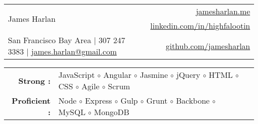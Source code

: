 \documentclass[11pt]{article}
\begin{document}
\setlength{\tabcolsep}{0in}

\begin{center}
\begin{tabularx}{1.0\textwidth}{l X r}
  \multirow{2}{*}{\Huge{James Harlan}}& & \href{http://www.jamesharlan.me}{\color{blue}jamesharlan.me} \\
   & & \href{https://www.linkedin.com/in/highfalootin}{\color{blue}linkedin.com/in/highfalootin} \\
  San Francisco Bay Area $\vert$ 307 247 3383 $\vert$ \href{mailto:james.harlan@gmail.com}{\color{blue}james.harlan@gmail.com} & & \href{http://github.com/jamesharlan}{\color{blue}github.com/jamesharlan}
\end{tabularx}

\vspace{2mm}


\vspace{2mm}

\begin{tabularx}{\textwidth}{r l X}
  \textbf{Strong : } & JavaScript $\circ$ Angular $\circ$ Jasmine $\circ$ jQuery $\circ$ HTML $\circ$ CSS $\circ$ Agile $\circ$ Scrum & \\
  \textbf{Proficient : } & Node $\circ$ Express $\circ$ Gulp $\circ$ Grunt $\circ$ Backbone $\circ$ MySQL $\circ$ MongoDB
\end{tabularx}



\end{center}
\end{document}

